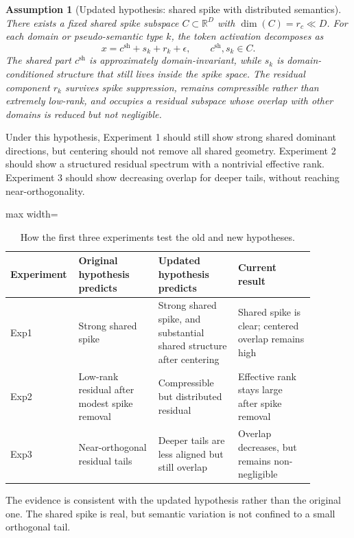 \documentclass[11pt]{article}
\newcommand{\tablesize}{\footnotesize}
\newtheorem{assumption}{Assumption}
\begin{document}
\begin{assumption}[Updated hypothesis: shared spike with distributed semantics]
There exists a fixed shared spike subspace $C \subset \mathbb{R}^D$ with $\dim(C)=r_c \ll D$. For each domain or pseudo-semantic type $k$, the token activation decomposes as
\[
x = c^{\mathrm{sh}} + s_k + r_k + \epsilon, \qquad c^{\mathrm{sh}}, s_k \in C.
\]
The shared part $c^{\mathrm{sh}}$ is approximately domain-invariant, while $s_k$ is domain-conditioned structure that still lives inside the spike space. The residual component $r_k$ survives spike suppression, remains compressible rather than extremely low-rank, and occupies a residual subspace whose overlap with other domains is reduced but not negligible.
\end{assumption}

Under this hypothesis, Experiment 1 should still show strong shared dominant directions, but centering should not remove all shared geometry. Experiment 2 should show a structured residual spectrum with a nontrivial effective rank. Experiment 3 should show decreasing overlap for deeper tails, without reaching near-orthogonality.

\begin{table}[H]
\centering
\tablesize
\begin{adjustbox}{max width=\linewidth}
\begin{tabular}{p{0.14\linewidth}p{0.25\linewidth}p{0.25\linewidth}p{0.24\linewidth}}
\toprule
Experiment & Original hypothesis predicts & Updated hypothesis predicts & Current result \\
\midrule
Exp1 & Strong shared spike & Strong shared spike, and substantial shared structure after centering & Shared spike is clear; centered overlap remains high \\
Exp2 & Low-rank residual after modest spike removal & Compressible but distributed residual & Effective rank stays large after spike removal \\
Exp3 & Near-orthogonal residual tails & Deeper tails are less aligned but still overlap & Overlap decreases, but remains non-negligible \\
\bottomrule
\end{tabular}
\end{adjustbox}
\caption{How the first three experiments test the old and new hypotheses.}
\label{tab:hypothesis-test-map}
\end{table}

The evidence is consistent with the updated hypothesis rather than the original one. The shared spike is real, but semantic variation is not confined to a small orthogonal tail.
\end{document}
